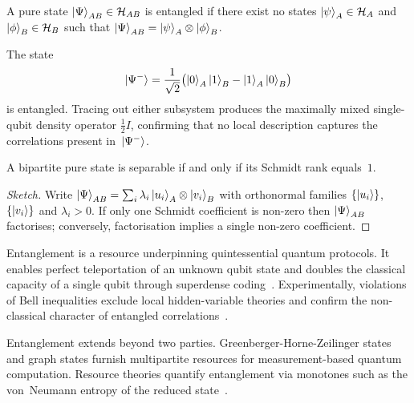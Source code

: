  \begin{definition}\label{def:entangled}
   A pure state $\ket{\Psi}_{AB}\in\mathcal H_{AB}$ is entangled if there exist no states $\ket{\psi}_A\in\mathcal H_A$ and $\ket{\phi}_B\in\mathcal H_B$ such that $\ket{\Psi}_{AB}=\ket{\psi}_A\otimes\ket{\phi}_B$.
 \end{definition}
 
 \begin{example}
   The state
   \[
     \ket{\Psi^-}=\frac1{\sqrt2}\bigl(\ket{0}_A\ket{1}_B-\ket{1}_A\ket{0}_B\bigr)
   \]
   is entangled.  
   Tracing out either subsystem produces the maximally mixed single-qubit density operator $\frac12I$, confirming that no local description captures the correlations present in~$\ket{\Psi^-}$.
 \end{example}
 
 \begin{proposition}
   A bipartite pure state is separable if and only if its Schmidt rank equals~$1$.
 \end{proposition}
 
 \begin{proof}[Sketch]
   Write $\ket{\Psi}_{AB}=\sum_i\lambda_i\ket{u_i}_A\otimes\ket{v_i}_B$ with orthonormal families $\{\ket{u_i}\}$, $\{\ket{v_i}\}$ and $\lambda_i>0$.  
   If only one Schmidt coefficient is non-zero then $\ket{\Psi}_{AB}$ factorises; conversely, factorisation implies a single non-zero coefficient.  
 \end{proof}
 
 
 Entanglement is a resource underpinning quintessential quantum protocols.  
 It enables perfect teleportation of an unknown qubit state and doubles the classical capacity of a single qubit through superdense coding~\cite{bennett1993teleporting}.  
 Experimentally, violations of Bell inequalities exclude local hidden-variable theories and confirm the non-classical character of entangled correlations~\cite{aspect1982experimental}.  
 
 \begin{remark}
   Entanglement extends beyond two parties.  
   Greenberger-Horne-Zeilinger states and graph states furnish multipartite resources for measurement-based quantum computation.  
   Resource theories quantify entanglement via monotones such as the von~Neumann entropy of the reduced state~\cite{horodecki2009quantum}.
 \end{remark}
 
